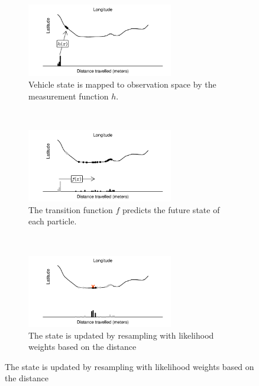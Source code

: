 \documentclass[times, doublespace]{anzsauth}
\begin{document}
\begin{figure}[p]
    \centering
    \begin{subfigure}[t]{1\textwidth}
        \centering
        \includegraphics[width=0.7\textwidth]{figures/03_particle_filter_1.pdf}
        \caption{
            Vehicle state is mapped to observation space by the
            measurement function $h$.
        }
        \label{fig:pf_state_prev}
    \end{subfigure}\\
    \begin{subfigure}[t]{0.9\textwidth}
        \centering
        \includegraphics[width=0.7\textwidth]{figures/03_particle_filter_2.pdf}
        \caption{
            The transition function $f$ predicts the future state
            of each particle.
        }
        \label{fig:pf_state_predict}
    \end{subfigure}\\
    \begin{subfigure}[t]{0.9\textwidth}
        \centering
        \includegraphics[width=0.7\textwidth]{figures/03_particle_filter_4.pdf}
        \caption{
            The state is updated by resampling with likelihood weights based on the distance
}
\end{subfigure}
\end{figure}
\end{document}
